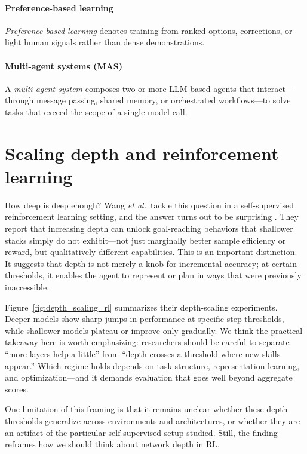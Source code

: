 \documentclass[conference]{IEEEtran}
\begin{document}
\paragraph{Preference-based learning} \emph{Preference-based learning} denotes training from ranked options, corrections, or light human signals rather than dense demonstrations.

\paragraph{Multi-agent systems (MAS)} A \emph{multi-agent system} composes two or more LLM-based agents that interact---through message passing, shared memory, or orchestrated workflows---to solve tasks that exceed the scope of a single model call.

\section{Scaling depth and reinforcement learning}
How deep is deep enough? Wang \emph{et al.}\ tackle this question in a self-supervised reinforcement learning setting, and the answer turns out to be surprising \cite{wang2025thousand}. They report that increasing depth can unlock goal-reaching behaviors that shallower stacks simply do not exhibit---not just marginally better sample efficiency or reward, but qualitatively different capabilities. This is an important distinction. It suggests that depth is not merely a knob for incremental accuracy; at certain thresholds, it enables the agent to represent or plan in ways that were previously inaccessible.

Figure~\ref{fig:depth_scaling_rl} summarizes their depth-scaling experiments. Deeper models show sharp jumps in performance at specific step thresholds, while shallower models plateau or improve only gradually. We think the practical takeaway here is worth emphasizing: researchers should be careful to separate ``more layers help a little'' from ``depth crosses a threshold where new skills appear.'' Which regime holds depends on task structure, representation learning, and optimization---and it demands evaluation that goes well beyond aggregate scores.

One limitation of this framing is that it remains unclear whether these depth thresholds generalize across environments and architectures, or whether they are an artifact of the particular self-supervised setup studied. Still, the finding reframes how we should think about network depth in RL.
\end{document}
